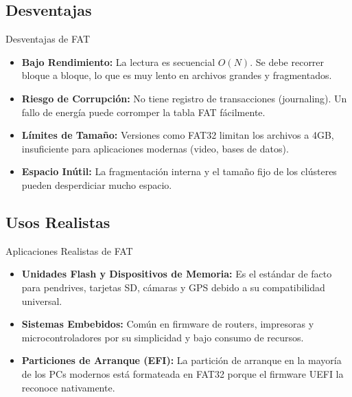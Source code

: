 \documentclass{beamer}
\begin{document}
\subsection{Desventajas}
\begin{frame}{Desventajas de FAT}
    \begin{itemize}
        \item \textbf{Bajo Rendimiento:} La lectura es secuencial $O(N)$. Se debe recorrer bloque a bloque, lo que es muy lento en archivos grandes y fragmentados.
        \vspace{0.5cm}
        \item \textbf{Riesgo de Corrupción:} No tiene registro de transacciones (journaling). Un fallo de energía puede corromper la tabla FAT fácilmente.
        \vspace{0.5cm}
        \item \textbf{Límites de Tamaño:} Versiones como FAT32 limitan los archivos a 4GB, insuficiente para aplicaciones modernas (video, bases de datos).
        \vspace{0.5cm}
        \item \textbf{Espacio Inútil:} La fragmentación interna y el tamaño fijo de los clústeres pueden desperdiciar mucho espacio.
    \end{itemize}
\end{frame}

\subsection{Usos Realistas}
\begin{frame}{Aplicaciones Realistas de FAT}
    \begin{itemize}
        \item \textbf{Unidades Flash y Dispositivos de Memoria:} Es el estándar de facto para pendrives, tarjetas SD, cámaras y GPS debido a su compatibilidad universal.
        \vspace{0.5cm}
        \item \textbf{Sistemas Embebidos:} Común en firmware de routers, impresoras y microcontroladores por su simplicidad y bajo consumo de recursos.
        \vspace{0.5cm}
        \item \textbf{Particiones de Arranque (EFI):} La partición de arranque en la mayoría de los PCs modernos está formateada en FAT32 porque el firmware UEFI la reconoce nativamente.
    \end{itemize}
\end{frame}
\end{document}
